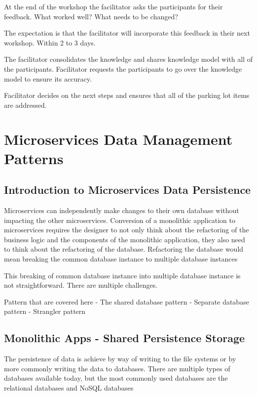 \documentclass[a4paper, 11pt]{book}
\begin{document}
    At the end of the workshop the facilitator asks the participants for their feedback.
    What worked well?
    What needs to be changed?

    The expectation is that the facilitator will incorporate this feedback in their next workshop.
    Within 2 to 3 days.

    The facilitator consolidates the knowledge and shares knowledge model with all of the participants.
    Facilitator requests the participants to go over the knowledge model to ensure its accuracy.

    Facilitator decides on the next steps and ensures that all of the parking lot items are addressed.



    \chapter{Microservices Data Management Patterns}


    \section{Introduction to Microservices Data Persistence}
    Microservices can independently make changes to their own database without impacting the other microservices.
    Conversion of a monolithic application to microservices requires the designer to not only think about the refactoring of the business logic and the components of the monolithic application,
    they also need to think about the refactoring of the database.
    Refactoring the database would mean breaking the common database instance to multiple database instances

    This breaking of common database instance into multiple database instance is not straightforward.
    There are multiple challenges.

    Pattern that are covered here
    - The shared database pattern
    - Separate database pattern
    - Strangler pattern


    \section{Monolithic Apps - Shared Persistence Storage}
    The persistence of data is achieve by way of writing to the file systems or by more commonly writing the data to databases.
    There are multiple types of databases available today, but the most commonly used databases are the relational databases and NoSQL databases
\end{document}
